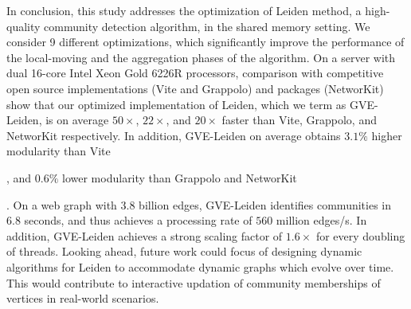 In conclusion, this study addresses the optimization of Leiden method, a high-quality community detection algorithm, in the shared memory setting. We consider 9 different optimizations, which significantly improve the performance of the local-moving and the aggregation phases of the algorithm. On a server with dual 16-core Intel Xeon Gold 6226R processors, comparison with competitive open source implementations (Vite and Grappolo) and packages (NetworKit) show that our optimized implementation of Leiden, which we term as GVE-Leiden, is on average $50\times$, $22\times$, and $20\times$ faster than Vite, Grappolo, and NetworKit respectively. In addition, GVE-Leiden on average obtains $3.1\%$ higher modularity than Vite, and $0.6\%$ lower modularity than Grappolo and NetworKit. On a web graph with $3.8$ billion edges, GVE-Leiden identifies communities in $6.8$ seconds, and thus achieves a processing rate of $560$ million edges/s. In addition, GVE-Leiden achieves a strong scaling factor of $1.6\times$ for every doubling of threads. Looking ahead, future work could focus of designing dynamic algorithms for Leiden to accommodate dynamic graphs which evolve over time. This would contribute to interactive updation of community memberships of vertices in real-world scenarios.
